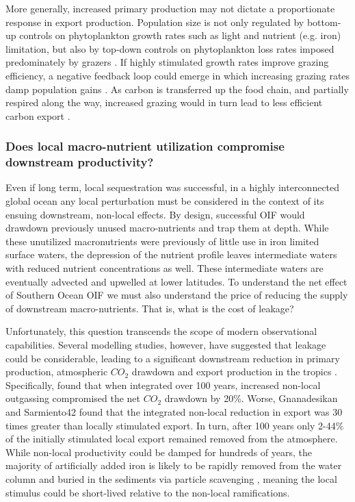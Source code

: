 More generally, increased primary production may not dictate a proportionate response in export production. Population size is not only regulated by bottom-up controls on phytoplankton growth rates such as light and nutrient (e.g. iron) limitation, but also by top-down controls on phytoplankton loss rates imposed predominately by grazers \parencite{BehrenfeldAnnualcyclesecological2013}. If highly stimulated growth rates improve grazing efficiency, a negative feedback loop could emerge in which increasing grazing rates damp population gains \parencite{RohrVariabilitymechanismscontrolling2017}. As carbon is transferred up the food chain, and partially respired along the way, increased grazing would in turn lead to less efficient carbon export \parencite{BoydImpactClimateChange2003}.


\subsubsection{Does local macro-nutrient utilization compromise downstream productivity?}


Even if long term, local sequestration was successful, in a highly interconnected global ocean any local perturbation must be considered in the context of its ensuing downstream, non-local effects. By design, successful OIF would drawdown previously unused macro-nutrients and trap them at depth. While these unutilized macronutrients were previously of little use in iron limited surface waters, the depression of the nutrient profile leaves intermediate waters with reduced nutrient concentrations as well. These intermediate waters are eventually advected and upwelled at lower latitudes. To understand the net effect of Southern Ocean OIF we must also understand the price of reducing the supply of downstream macro-nutrients. That is, what is the cost of leakage?

Unfortunately, this question transcends the scope of modern observational capabilities. Several modelling studies, however, have suggested that leakage could be considerable, leading to a significant downstream reduction in primary production, atmospheric $CO_2$ drawdown and export production in the tropics \parencite{GnanadesikanEffectspatchyocean2003, AumontGlobalizingresultsocean2006, OschliesSideeffectsaccounting2010, SarmientoThreedimensionalsimulationsimpact1991}. Specifically, \textcite{OschliesSideeffectsaccounting2010} found that when integrated over 100 years, increased non-local outgassing compromised the net $CO_2$ drawdown by 20\%. Worse, Gnanadesikan and Sarmiento42 found that the integrated non-local reduction in export was 30 times greater than locally stimulated export. In turn, after 100 years only 2-44\% of the initially stimulated local export remained removed from the atmosphere. While non-local productivity could be damped for hundreds of years, the majority of artificially added iron is likely to be rapidly removed from the water column and buried in the sediments via particle scavenging \parencite{AumontGlobalizingresultsocean2006}, meaning the local stimulus could be short-lived relative to the non-local ramifications.


